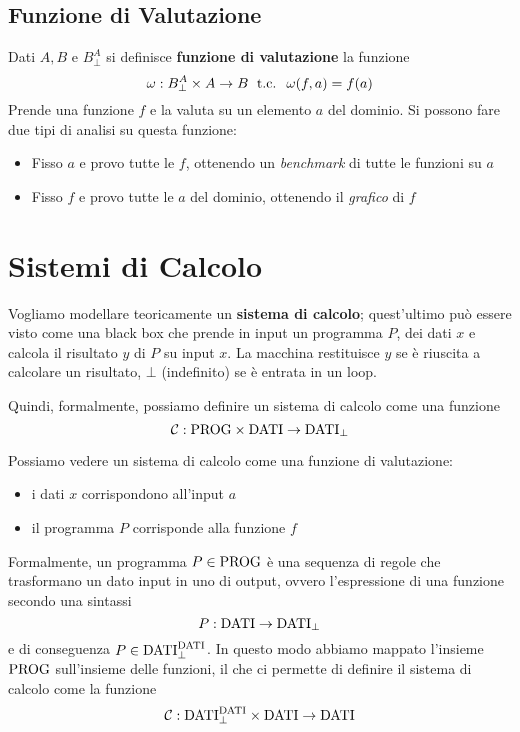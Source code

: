 \subsection{Funzione di Valutazione}
Dati $A,B$ e $B^A_\bot$ si definisce \textbf{funzione di valutazione} la funzione
$$ \omega: B^A_\bot \times A \rightarrow B \; \text{ t.c. } \; \omega (f,a) = f(a) $$
Prende una funzione $f$ e la valuta su un elemento $a$ del dominio. Si possono fare due tipi di analisi su questa funzione: 
\begin{itemize}
	\item Fisso $a$ e provo tutte le $f$, ottenendo un \textit{benchmark} di tutte le funzioni su $a$
	\item Fisso $f$ e provo tutte le $a$ del dominio, ottenendo il \textit{grafico} di $f$
\end{itemize}

\section{Sistemi di Calcolo}

Vogliamo modellare teoricamente un \textbf{sistema di calcolo}; quest'ultimo può essere visto come una black box che prende in input un programma $P$, dei dati $x$ e calcola il risultato $y$ di $P$ su input $x$. La macchina restituisce $y$ se è riuscita a calcolare un risultato, $\bot$ (indefinito) se è entrata in un loop.
\begin{center}
	
\end{center}

Quindi, formalmente, possiamo definire un sistema di calcolo come una funzione 
$$ \mathcal{C}: \text{PROG} \times \text{DATI} \rightarrow \text{DATI}_\bot $$

Possiamo vedere un sistema di calcolo come una funzione di valutazione:
\begin{itemize}
	\item i dati $x$ corrispondono all'input $a$
	\item il programma $P$ corrisponde alla funzione $f$
\end{itemize}

Formalmente, un programma $P \in \text{PROG}$ è una sequenza di regole che trasformano un dato input in uno di output, ovvero l'espressione di una funzione secondo una sintassi 
$$ P: \text{DATI} \rightarrow \text{DATI}_\bot $$
e di conseguenza $P \in \text{DATI}^{\text{DATI}}_\bot$. In questo modo abbiamo mappato l'insieme $\text{PROG}$ sull'insieme delle funzioni, il che ci permette di definire il sistema di calcolo come la funzione
$$ \mathcal{C}: \text{DATI}^{\text{DATI}}_\bot \times \text{DATI} \rightarrow \text{DATI} $$

